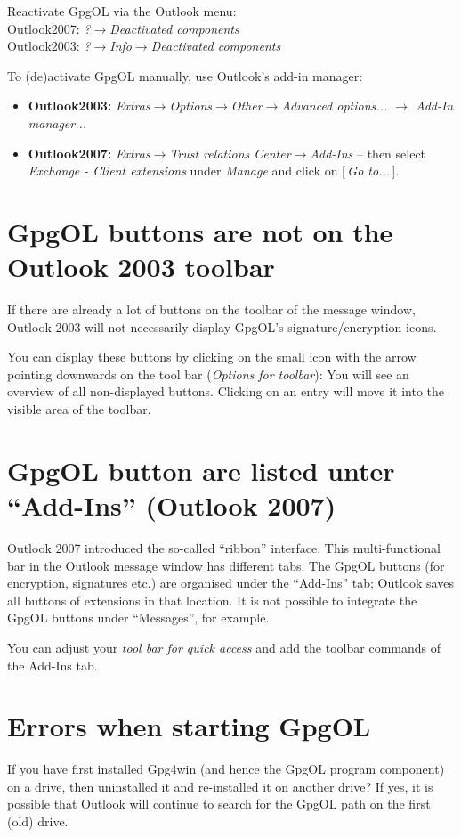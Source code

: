 \documentclass[a4paper,11pt,oneside,openright,titlepage]{scrbook}
\newcommand{\Button}[1]{[\,\textit{#1}\,]}
\newcommand{\Menu}[1]{\textit{#1}}
\begin{document}
Reactivate GpgOL via the Outlook menu:\\
Outlook2007: \Menu{?$\rightarrow$Deactivated components}\\
Outlook2003: \Menu{?$\rightarrow$Info$\rightarrow$Deactivated components}

To (de)activate GpgOL manually, use Outlook's add-in manager:
\begin{itemize}
    \item \textbf{Outlook2003:}
        \Menu{Extras$\rightarrow$Options$\rightarrow$Other$\rightarrow$Advanced
        options... $\rightarrow$ Add-In manager...}
    \item \textbf{Outlook2007:}
        \Menu{Extras$\rightarrow$Trust relations
        Center$\rightarrow$Add-Ins} -- then select \Menu{Exchange -
        Client extensions} under \Menu{Manage} and click on \Button{Go
        to...}.
\end{itemize}

\section{GpgOL buttons are not on the Outlook 2003 toolbar}

If there are already a lot of buttons on the toolbar of the message
window, Outlook 2003 will not necessarily display GpgOL's
signature/encryption icons.

You can display these buttons by clicking on the small icon with the
arrow pointing downwards on the tool bar (\Menu{Options for toolbar}):
You will see an overview of all non-displayed buttons. Clicking on an
entry will move it into the visible area of the toolbar.


\section{GpgOL button are listed unter ``Add-Ins'' (Outlook 2007)}

Outlook 2007 introduced the so-called ``ribbon'' interface. This
multi-functional bar in the Outlook message window has different tabs.
The GpgOL buttons (for encryption, signatures etc.) are organised
under the ``Add-Ins'' tab; Outlook saves all buttons of extensions in
that location. It is not possible to integrate the GpgOL buttons under
``Messages'', for example.

You can adjust your \Menu{tool bar for quick access} and add the
toolbar commands of the Add-Ins tab.


\section{Errors when starting GpgOL}
If you have first installed Gpg4win (and hence the GpgOL program
component) on a drive, then uninstalled it and re-installed it on
another drive? If yes, it is possible that Outlook will continue to
search for the GpgOL path on the first (old) drive.
\end{document}
